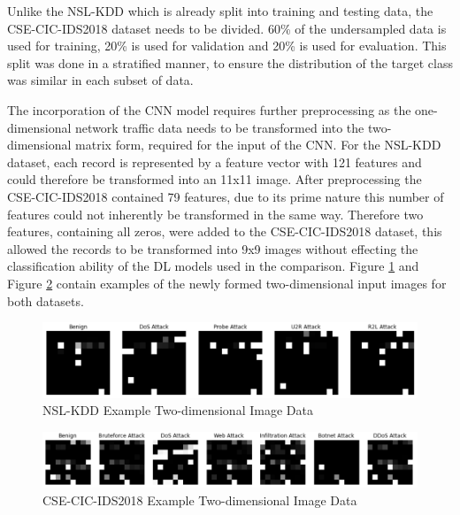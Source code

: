 \documentclass[conference]{IEEEtran}
\begin{document}
Unlike the NSL-KDD which is already split into training and testing data, the CSE-CIC-IDS2018 dataset needs to be divided. 60\% of the undersampled data is used for training, 20\% is used for validation and 20\% is used for evaluation. This split was done in a stratified manner, to ensure the distribution of the target class was similar in each subset of data. 

The incorporation of the CNN model requires further preprocessing as the one-dimensional network traffic data needs to be transformed into the two-dimensional matrix form, required for the input of the CNN. For the NSL-KDD dataset, each record is represented by a feature vector with 121 features and could therefore be transformed into an 11x11 image. After preprocessing the CSE-CIC-IDS2018 contained 79 features, due to its prime nature this number of features could not inherently be transformed in the same way. Therefore two features, containing all zeros, were added to the CSE-CIC-IDS2018 dataset, this allowed the records to be transformed into 9x9 images without effecting the classification ability of the DL models used in the comparison. Figure \ref{nsl_class} and Figure \ref{cic_class} contain examples of the newly formed two-dimensional input images for both datasets. 



\begin{figure}[htbp]
\centerline{\includegraphics[scale=0.5]{images/nsl_kdd_classes.png}}
\caption{NSL-KDD Example Two-dimensional Image Data}
\label{nsl_class}
\end{figure}

\begin{figure}[htbp]
\centerline{\includegraphics[scale=0.5]{images/cic_cse_classes.png}}
\caption{CSE-CIC-IDS2018 Example Two-dimensional Image Data}
\label{cic_class}
\end{figure}
\end{document}
